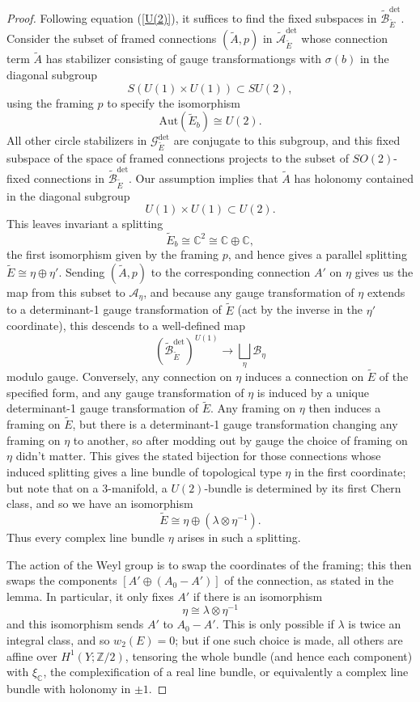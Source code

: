 \documentclass{memo-l}
\theoremstyle{definition}
\theoremstyle{remark}
\numberwithin{section}{chapter}
\numberwithin{equation}{chapter}
\begin{document}
\begin{proof}Following equation (\ref{U(2)}), it suffices to find the fixed subspaces in $\widetilde{\mathcal B}_{\tilde E}^{\text{det}}$. Consider the subset of framed connections $(\tilde A, p)$ in $\widetilde{\mathcal A}_{\tilde E}^{\det}$ whose connection term $\tilde A$ has stabilizer consisting of gauge transformationgs with $\sigma(b)$ in the diagonal subgroup $$S(U(1) \times U(1)) \subset SU(2),$$ using the framing $p$ to specify the isomorphism $$\text{Aut}(\tilde E_b) \cong U(2).$$ All other circle stabilizers in $\mathcal G_{\tilde E}^{\text{det}}$ are conjugate to this subgroup, and this fixed subspace of the space of framed connections projects to the subset of $SO(2)$-fixed connections in $\widetilde{\mathcal B}_{\tilde E}^{\text{det}}$. Our assumption implies that $\tilde A$ has holonomy contained in the diagonal subgroup 
$$U(1) \times U(1) \subset U(2).$$ This leaves invariant a splitting $$\tilde E_b \cong \mathbb C^2 \cong \mathbb C \oplus \mathbb C,$$ the first isomorphism given by the framing $p$, and hence gives a parallel splitting $\tilde E \cong \eta \oplus \eta'$. Sending $(\tilde A, p)$ to the corresponding connection $A'$ on $\eta$ gives us the map from this subset to $\mathcal A_\eta$, and because any gauge transformation of $\eta$ extends to a determinant-1 gauge transformation of $\tilde E$ (act by the inverse in the $\eta'$ coordinate), this descends to a well-defined map $$\left(\widetilde{\mathcal B}_{\tilde E}^{\text{det}}\right)^{U(1)} \to \bigsqcup_\eta \mathcal B_\eta$$ modulo gauge. Conversely, any connection on $\eta$ induces a connection on $\tilde E$ of the specified form, and any gauge transformation of $\eta$ is induced by a unique determinant-1 gauge transformation of $\tilde E$. Any framing on $\eta$ then induces a framing on $\tilde E$, but there is a determinant-1 gauge transformation changing any framing on $\eta$ to another, so after modding out by gauge the choice of framing on $\eta$ didn't matter. This gives the stated bijection for those connections whose induced splitting gives a line bundle of topological type $\eta$ in the first coordinate; but note that on a 3-manifold, a $U(2)$-bundle is determined by its first Chern class, and so we have an isomorphism $$\tilde E \cong \eta \oplus (\lambda \otimes \eta^{-1}).$$ Thus every complex line bundle $\eta$ arises in such a splitting.

The action of the Weyl group is to swap the coordinates of the framing; this then swaps the components $[A' \oplus (A_0 - A')]$ of the connection, as stated in the lemma. In particular, it only fixes $A'$ if there is an isomorphism $$\eta \cong \lambda \otimes \eta^{-1}$$ and this isomorphism sends $A'$ to $A_0 - A'$. This is only possible if $\lambda$ is twice an integral class, and so $w_2(E) = 0$; but if one such choice is made, all others are affine over $H^1(Y;\mathbb Z/2)$, tensoring the whole bundle (and hence each component) with $\xi_{\mathbb C}$, the complexification of a real line bundle, or equivalently a complex line bundle with holonomy in $\pm 1$.\end{proof}
\end{document}
